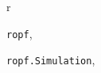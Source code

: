 \documentclass[letterpaper,10pt,english]{sphinxmanual}
\begin{document}
\renewcommand{\indexname}{Python Module Index}
\begin{theindex}
\def\bigletter#1{{\Large\sffamily#1}\nopagebreak\vspace{1mm}}
\bigletter{r}
\item {\texttt{ropf}}, \pageref{ropf:module-ropf}
\item {\texttt{ropf.Simulation}}, \pageref{ropf:module-ropf.Simulation}
\end{theindex}

\renewcommand{\indexname}{Index}
\printindex
\end{document}
